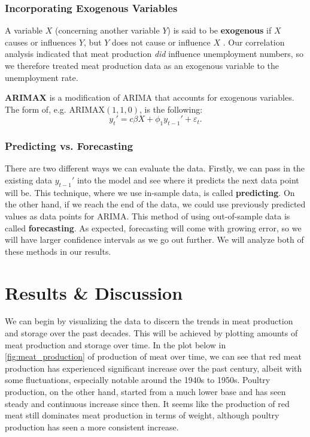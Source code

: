 \documentclass[12pt]{article}
\begin{document}
    \subsubsection{Incorporating Exogenous Variables}
    A variable $X$ (concerning another variable $Y$) is said to be \textbf{exogenous} if $X$ causes or influences $Y$, but $Y$ does not cause or influence $X$ \cite{box2015time}. Our correlation analysis indicated that meat production \textit{did} influence unemployment numbers, so we therefore treated meat production data as an exogenous variable to the unemployment rate. 

    \textbf{ARIMAX} is a modification of ARIMA that accounts for exogenous variables. The form of, e.g. $\mathrm{ARIMAX}(1,1,0)$, is the following: 
    \begin{equation}
        y_t' = c \beta X + \phi_1 y_{t-1}' + \varepsilon_t.
    \end{equation}

    \subsubsection{Predicting vs. Forecasting}
    There are two different ways we can evaluate the data. Firstly, we can pass in the existing data $y_{t-1}'$ into the model and see where it predicts the next data point will be. This technique, where we use in-sample data, is called \textbf{predicting}. On the other hand, if we reach the end of the data, we could use previously predicted values as data points for ARIMA. This method of using out-of-sample data is called \textbf{forecasting}. As expected, forecasting will come with growing error, so we will have larger confidence intervals as we go out further. We will analyze both of these methods in our results. 


\section{Results \& Discussion}

We can begin by visualizing the data to discern the trends in meat production and storage over the past decades. This will be achieved by plotting amounts of meat production and storage over time. In the plot below in \ref{fig:meat_production} of production of meat over time, we can see that red meat production has experienced significant increase over the past century, albeit with some fluctuations, especially notable around the 1940s to 1950s. Poultry production, on the other hand, started from a much lower base and has seen steady and continuous increase since then. It seems like the production of red meat still dominates meat production in terms of weight, although poultry production has seen a more consistent increase.
\end{document}
